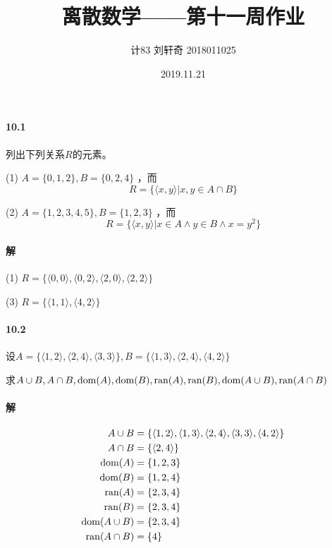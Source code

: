 \documentclass[UTF8]{ctexart}
\title{离散数学——第十一周作业}
\author{计83  刘轩奇  2018011025}
\date{2019.11.21}
\newcommand{\ran}{{\rm ran}}
\newcommand{\dom}{{\rm dom}}
\begin{document}
\maketitle

\paragraph{10.1}\label{10.1}
列出下列关系$R$的元素。

(1) $ A = \{ 0,1,2 \} , B= \{ 0,2,4 \} $ ，而
$$ R = \{ \langle x,y \rangle | x,y \in A \cap B \}  $$

(2) $ A = \{ 1,2,3,4,5 \}, B = \{1,2,3\}$ ，而
$$R = \{ \langle x,y \rangle | x \in A \land y \in B \land x = y^2 \} $$

\paragraph{解}
(1) $R = \{ \langle 0,0 \rangle , \langle 0,2 \rangle , \langle 2,0 \rangle , \langle 2,2 \rangle \} $

(3) $R = \{ \langle 1,1 \rangle , \langle 4,2 \rangle \} $

\paragraph{10.2}\label{10.2}
设$A = \{ \langle 1,2 \rangle , \langle 2,4 \rangle , \langle 3,3 \rangle \} , B = \{ \langle 1,3 \rangle , \langle 2,4 \rangle , \langle 4,2 \rangle \} $

求$A \cup B, A \cap B, \dom(A), \dom(B), \ran(A), \ran(B), \dom(A \cup B), \ran(A \cap B)$

\paragraph{解}
\begin{align*}
    A \cup B & = \{ \langle 1,2 \rangle , \langle 1,3 \rangle , \langle 2,4 \rangle , \langle 3,3 \rangle , \langle 4,2 \rangle \} \\
    A \cap B & = \{ \langle 2,4 \rangle \} \\
    \dom(A) & = \{ 1,2,3 \} \\
    \dom(B) & = \{ 1,2,4 \} \\
    \ran(A) & = \{ 2,3,4 \} \\
    \ran(B) & = \{ 2,3,4 \} \\
    \dom(A \cup B) & = \{ 2,3,4 \} \\
    \ran(A \cap B) & = \{ 4 \} 
\end{align*}
\end{document}
